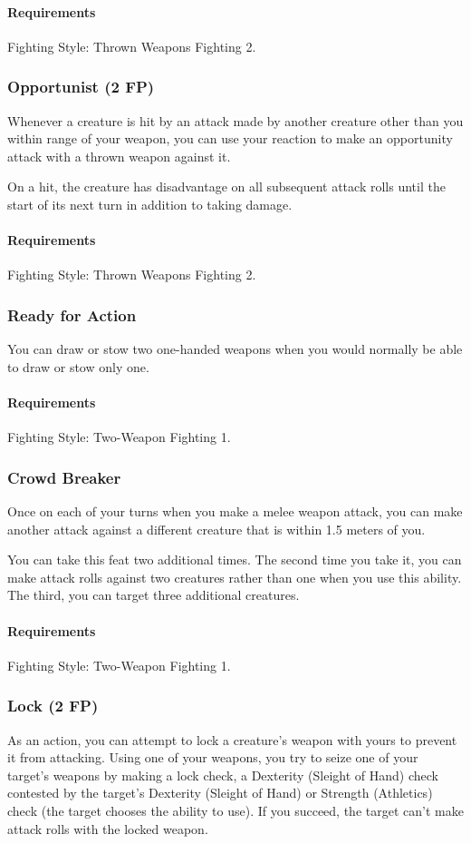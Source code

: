     \paragraph{Requirements} Fighting Style: Thrown Weapons Fighting 2.
\subsubsection{Opportunist (2 FP)} \label{feat::opportunist}
    Whenever a creature is hit by an attack made by another creature other than you within range of your weapon, you can use your reaction to make an opportunity attack with a thrown weapon against it.

    On a hit, the creature has disadvantage on all subsequent attack rolls until the start of its next turn in addition to taking damage.
    \paragraph{Requirements} Fighting Style: Thrown Weapons Fighting 2.
\subsubsection{Ready for Action} \label{feat::readyforaction}
    You can draw or stow two one-handed weapons when you would normally be able to draw or stow only one.
    \paragraph{Requirements} Fighting Style: Two-Weapon Fighting 1.
\subsubsection{Crowd Breaker} \label{feat::crowdbreaker}
    Once on each of your turns when you make a melee weapon attack, you can make another attack against a different creature that is within 1.5 meters of you.

    You can take this feat two additional times.
    The second time you take it, you can make attack rolls against two creatures rather than one when you use this ability.
    The third, you can target three additional creatures.
    \paragraph{Requirements} Fighting Style: Two-Weapon Fighting 1.
\subsubsection{Lock (2 FP)} \label{feat::lock}
    As an action, you can attempt to lock a creature's weapon with yours to prevent it from attacking.
    Using one of your weapons, you try to seize one of your target's weapons by making a lock check, a Dexterity (Sleight of Hand) check contested by the target's Dexterity (Sleight of Hand) or Strength (Athletics) check (the target chooses the ability to use).
    If you succeed, the target can't make attack rolls with the locked weapon.

